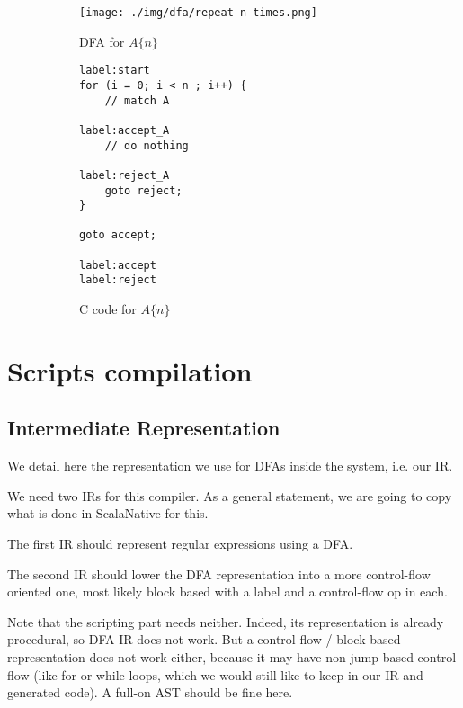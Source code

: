 \documentclass[11pt,a4paper]{report}
\newcommand{\regexp}[1]{$#1$}
\begin{document}
\begin{figure}[h!]
	\begin{subfigure}[h]{0.45\textwidth}
		\centering
		\texttt{[image: ./img/dfa/repeat-n-times.png]}
		\caption{DFA for \regexp{A\{n\}}}
	\end{subfigure}
	\hspace{0.05\textwidth}
	\begin{subfigure}[h]{0.45\textwidth}
		\centering
		\begin{lstlisting}[style=C]
label:start
for (i = 0; i < n ; i++) {
	// match A

label:accept_A
	// do nothing

label:reject_A
	goto reject;
}

goto accept;

label:accept
label:reject
		\end{lstlisting}
		\caption{C code for \regexp{A\{n\}}}
	\end{subfigure}
	\caption{}
	\label{dfatoc-ntimes}
\end{figure}

\chapter{Scripts compilation}

\section{Intermediate Representation}
\label{ir}

We detail here the representation we use for DFAs inside the system, i.e. our IR.

We need two IRs for this compiler. As a general statement, we are going to copy what is done in ScalaNative for this.

The first IR should represent regular expressions using a DFA.

The second IR should lower the DFA representation into a more control-flow oriented one, most likely block based with a label and a control-flow op in each.

Note that the scripting part needs neither. Indeed, its representation is already procedural, so DFA IR does not work. But a control-flow / block based representation does not work either,  because it may have non-jump-based control flow (like for or while loops, which we would still like to keep in our IR and generated code). A full-on AST should be fine here.
\end{document}
